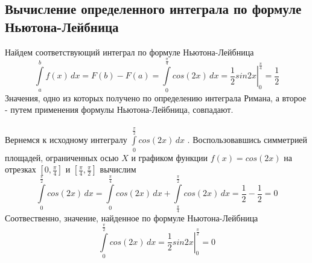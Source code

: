 \documentclass[a5paper, 10pt]{article}
\theoremstyle{definition}
\theoremstyle{plain}
\theoremstyle{remark}
\begin{document}
 \subsection{Вычисление определенного интеграла по формуле Ньютона-Лейбница}
Найдем соответствующий интеграл по формуле Ньютона-Лейбница
\begin{equation}
\int\limits_a^b f(x) \,dx = F(b) - F(a) = \int\limits_0^\frac{\pi}{4} cos(2x) \,dx =\left. \frac{1}{2}sin2x \right|_0^\frac{\pi}{4} =  \frac{1}{2}
\end{equation}
Значения, одно из которых получено по определению интеграла Римана, а второе - путем применения формулы Ньютона-Лейбница, совпадают. \\
\\
Вернемся к исходному интегралу $\int\limits_0^\frac{\pi}{2} cos(2x) \,dx$ . Воспользовавшись симметрией площадей, ограниченных осью $ X$ и графиком функции $f(x) = cos(2x)$  на отрезках $[0, \frac{\pi}{4}]$ и  $[ \frac{\pi}{4},\frac{\pi}{2} ]$ вычислим
\begin{equation}
\int\limits_0^\frac{\pi}{2} cos(2x) \,dx = \int\limits_0^\frac{\pi}{4} cos(2x) \,dx + \int\limits_\frac{\pi}{4}^\frac{\pi}{2} cos(2x) \,dx  = \frac{1}{2} - \frac{1}{2} = 0
\end{equation}
Соотвественно, значение, найденное по формуле Ньютона-Лейбница
\begin{equation}
 \int\limits_0^\frac{\pi}{2} cos(2x) \,dx =\left. \frac{1}{2}sin2x \right|_0^\frac{\pi}{2} = 0
\end{equation}
\end{document}
